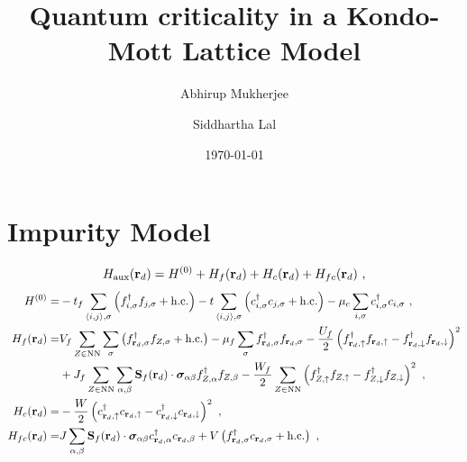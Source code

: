 \documentclass[%
reprint,
superscriptaddress,
groupedaddress,
superscriptaddress,
onecolumn,
]{revtex4-2}
\begin{document}
\title{Quantum criticality in a Kondo-Mott Lattice Model}

\author{Abhirup Mukherjee}
\author{Siddhartha Lal}

\date{\today}

\maketitle
\section{Impurity Model}
\begin{equation}\begin{aligned}
	H_\text{aux}({\bf r}_d) = H^{(0)} + H_f({\bf r}_d) + H_c({\bf r}_d) + H_{fc}({\bf r}_d)~,
\end{aligned}\end{equation}
\begin{equation}\begin{aligned}
	H^{(0)} =& -t_f\sum_{\braket{i,j},\sigma}\left(f^\dagger_{i,\sigma}f_{j,\sigma} + \text{h.c.}\right) -t\sum_{\braket{i,j},\sigma}\left(c^\dagger_{i,\sigma}c_{j,\sigma} + \text{h.c.}\right) - \mu_c\sum_{i,\sigma}c^\dagger_{i,\sigma}c_{i,\sigma}~,\\
	H_f({\bf r}_d) =& V_f\sum_{Z \in \text{NN}}\sum_{\sigma}\left(f^\dagger_{{\bf r}_d,\sigma} f_{Z,\sigma} + \text{h.c.}\right) -\mu_f \sum_\sigma f^\dagger_{{\bf r}_d,\sigma}f_{{\bf r}_d,\sigma} - \frac{U_f}{2}\left(f^\dagger_{{\bf r}_d,\uparrow}f_{{\bf r}_d,\uparrow} - f^\dagger_{{\bf r}_d,\downarrow}f_{{\bf r}_d,\downarrow}\right)^2 \\
				   &+ J_f\sum_{Z \in \text{NN}}\sum_{\alpha,\beta}{\bf S}_f({\bf r}_d) \cdot {\boldsymbol{\sigma}}_{\alpha\beta}f^\dagger_{Z,\alpha}f_{Z,\beta} - \frac{W_f}{2} \sum_{Z \in \text{NN}}\left(f^\dagger_{Z,\uparrow}f_{Z,\uparrow} - f^\dagger_{Z,\downarrow}f_{Z,\downarrow} \right)^2~,\\
	H_c({\bf r}_d) =& - \frac{W}{2}\left(c^\dagger_{{\bf r}_d,\uparrow}c_{{\bf r}_d,\uparrow} - c^\dagger_{{\bf r}_d,\downarrow}c_{{\bf r}_d,\downarrow} \right)^2~,\\
	H_{fc}({\bf r}_d) =& J\sum_{\alpha,\beta}{\bf S}_f({\bf r}_d) \cdot {\boldsymbol{\sigma}}_{\alpha\beta}c^\dagger_{{\bf r}_d,\alpha}c_{{\bf r}_d,\beta} + V \left(f^\dagger_{{\bf r}_d,\sigma} c_{{\bf r}_d,\sigma} + \text{h.c.}\right)~,\\
\end{aligned}\end{equation}
\end{document}
